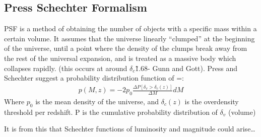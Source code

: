 	\subsection{Press Schechter Formalism} %
	\label{sub:press_schechter_formalism}
		PSF is a method of obtaining the number of objects with a specific mass within a certain volume. It assumes that the universe linearly ``clumped'' at the beginning of the universe, until a point where the density of the clumps break away from the rest of the universal expansion, and is treated as a massive body which collapses rapidly. (this occurs at around $\delta_c$\~1.68- Gunn and Gott). Press and Schechter suggest a probability distribution function of =:
		\begin{align}
		p(M,z)=-2p_0 \frac{\Delta P [\delta_v>\delta_c(z)]} {\Delta M} dM
		\end{align}
		Where $p_0$ is the mean density of the universe, and $\delta_c(z)$ is the overdensity threshold per redshift. P is the cumulative probability distribution of $\delta_v$ (volume)

		It is from this that Schechter functions of luminosity and magnitude could arise\ldots

